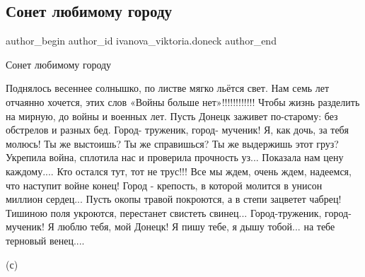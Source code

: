  
 
 
 
 
 
\subsection{Сонет любимому городу}
\label{sec:30_08_2021.fb.ivanova_viktoria.doneck.1.sonet_gorod_doneck}
 
\ifcmt
 author_begin
   author_id ivanova_viktoria.doneck
 author_end
\fi

Сонет любимому городу 

\begin{multicols}{2}
\obeycr
Поднялось весеннее солнышко, по листве мягко льётся свет.
Нам семь лет отчаянно хочется, этих слов «Войны больше нет»!!!!!!!!!!!!
Чтобы жизнь разделить на мирную, до войны и военных лет.
\smallskip
Пусть Донецк заживет по-старому: без обстрелов и разных бед.
Город- труженик, город- мученик! Я, как дочь, за тебя молюсь!
Ты же выстоишь? Ты же справишься? Ты же выдержишь этот груз?
\smallskip
Укрепила война, сплотила нас и проверила прочность уз...
Показала нам цену каждому.... Кто остался тут, тот не трус!!!
Все мы ждем, очень ждем, надеемся, что наступит войне конец!
\smallskip
Город - крепость, в которой молится в унисон миллион сердец...
Пусть окопы травой покроются, а в степи зацветет чабрец!
Тишиною поля укроются, перестанет свистеть свинец...
\smallskip
Город-труженик, город-мученик! Я люблю тебя, мой Донецк!
Я пишу тебе, я дышу тобой... на тебе терновый венец....
\restorecr
\end{multicols}

(с)


